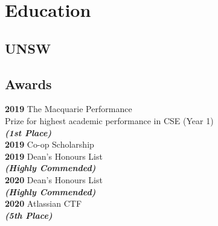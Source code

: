 \documentclass[a4paper]{deedy-resume}
\begin{document}
\begin{minipage}[t]{0.33\textwidth}


\section{Education} 

\subsection{UNSW}


\sectionspace

\subsection{Awards}

\textbf{2019}
The Macquarie Performance \\
Prize for highest academic performance
in CSE (Year 1) \\
{\footnotesize \textit{\textbf{(1st Place) }}} \\

\textbf{2019}
Co-op Scholarship \\

\textbf{2019}
Dean's Honours List \\
{\footnotesize \textit{\textbf{(Highly Commended) }}} \\

\textbf{2020}
Dean's Honours List \\
{\footnotesize \textit{\textbf{(Highly Commended) }}} \\

\textbf{2020}
Atlassian CTF \\
{\footnotesize \textit{\textbf{(5th Place) }}} \\

\sectionspace


\end{minipage}
\end{document}
